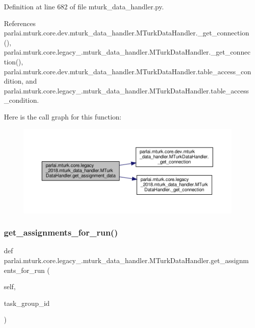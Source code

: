 Definition at line 682 of file mturk\+\_\+data\+\_\+handler.\+py.



References parlai.\+mturk.\+core.\+dev.\+mturk\+\_\+data\+\_\+handler.\+M\+Turk\+Data\+Handler.\+\_\+get\+\_\+connection(), parlai.\+mturk.\+core.\+legacy\+\_.\+mturk\+\_\+data\+\_\+handler.\+M\+Turk\+Data\+Handler.\+\_\+get\+\_\+connection(), parlai.\+mturk.\+core.\+dev.\+mturk\+\_\+data\+\_\+handler.\+M\+Turk\+Data\+Handler.\+table\+\_\+access\+\_\+condition, and parlai.\+mturk.\+core.\+legacy\+\_.\+mturk\+\_\+data\+\_\+handler.\+M\+Turk\+Data\+Handler.\+table\+\_\+access\+\_\+condition.

Here is the call graph for this function\+:
\nopagebreak
\begin{figure}[H]
\begin{center}
\leavevmode
\includegraphics[width=350pt]{classparlai_1_1mturk_1_1core_1_1legacy__2018_1_1mturk__data__handler_1_1MTurkDataHandler_a31d6cd2577202bf2e6e4984a02f14f2a_cgraph}
\end{center}
\end{figure}
\mbox{\label{classparlai_1_1mturk_1_1core_1_1legacy__2018_1_1mturk__data__handler_1_1MTurkDataHandler_a4a1d5f9b4aed51ba98d4979317ef9329}} 
\subsubsection{\texorpdfstring{get\+\_\+assignments\+\_\+for\+\_\+run()}{get\_assignments\_for\_run()}}
{\footnotesize\ttfamily def parlai.\+mturk.\+core.\+legacy\+\_.\+mturk\+\_\+data\+\_\+handler.\+M\+Turk\+Data\+Handler.\+get\+\_\+assignments\+\_\+for\+\_\+run (\begin{DoxyParamCaption}\item[{}]{self,  }\item[{}]{task\+\_\+group\+\_\+id }\end{DoxyParamCaption})}

